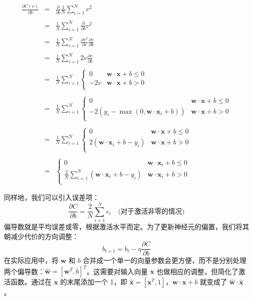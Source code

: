 \documentclass[11pt]{article}
\begin{document}
\begin{center}
\begin{eqnarray*}
 \frac{\partial C(v)}{\partial b} & = & \frac{\partial }{\partial b}\frac{1}{N} \sum_{i=1}^N v^2\\\\
 & = & \frac{1}{N} \sum_{i=1}^N \frac{\partial}{\partial b} v^2\\\\
 & = & \frac{1}{N} \sum_{i=1}^N \frac{\partial v^2}{\partial v} \frac{\partial v}{\partial b} \\\\
 & = & \frac{1}{N} \sum_{i=1}^N 2v \frac{\partial v}{\partial b} \\\\
 & = & \frac{1}{N} \sum_{i=1}^N \begin{cases}
 	0 & \mathbf{w} \cdot \mathbf{x} + b \leq 0\\
 	-2v & \mathbf{w} \cdot \mathbf{x} + b > 0\\
 \end{cases}\\\\
 & = & \frac{1}{N} \sum_{i=1}^N \begin{cases}
 	0 & \mathbf{w} \cdot \mathbf{x} + b \leq 0\\
 	-2(y_i-\max(0, \mathbf{w}\cdot\mathbf{x}_i+b)) & \mathbf{w} \cdot \mathbf{x} + b > 0\\
 \end{cases}\\\\
 & = & \frac{1}{N} \sum_{i=1}^N \begin{cases}
 	0 & \mathbf{w} \cdot \mathbf{x} + b \leq 0\\
 	2(\mathbf{w}\cdot\mathbf{x}_i+b-y_i) & \mathbf{w} \cdot \mathbf{x} + b > 0\\
 \end{cases}\\\\
 & = & \begin{cases}
	0 & \mathbf{w} \cdot \mathbf{x}_i + b \leq 0\\
	\frac{2}{N} \sum_{i=1}^N (\mathbf{w}\cdot\mathbf{x}_i+b-y_i) & \mathbf{w} \cdot \mathbf{x}_i + b > 0\\
 \end{cases}
\end{eqnarray*}
\end{center}
同样地，我们可以引入误差项：
\[ \frac{\partial C}{\partial b} = \frac{2}{N} \sum_{i=1}^N e_i \quad \text{(对于激活非零的情况)} \]
偏导数就是平均误差或零，根据激活水平而定。为了更新神经元的偏置，我们将其朝减少代价的方向调整：
\[ b_{t+1} = b_{t} - \eta \frac{\partial C}{\partial b} \]
在实际应用中，将 $\mathbf{w}$ 和 $b$ 合并成一个单一的向量参数会更方便，而不是分别处理两个偏导数：$\hat{\mathbf{w}} = [\mathbf{w}^T, b]^T$。这需要对输入向量 $\mathbf{x}$ 也做相应的调整，但简化了激活函数。通过在 $\mathbf{x}$ 的末尾添加一个 1，即 $\hat{\mathbf{x}} = [\mathbf{x}^T,1]$，$\mathbf{w} \cdot \mathbf{x} + b$ 就变成了 $\hat{\mathbf{w}} \cdot \hat{\mathbf{x}}$。
\end{document}
